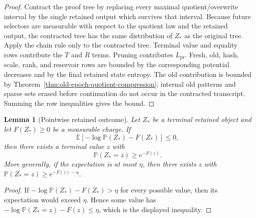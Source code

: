 \documentclass[11pt]{article}
\newtheorem{lemma}[theorem]{Lemma}
\theoremstyle{remark}
\newcommand{\E}{\mathbb E}
\newcommand{\Prob}{\mathbb P}
\newcommand{\pr}{\mathrm{pr}}
\begin{document}
\begin{proof}
Contract the proof tree by replacing every maximal quotient/overwrite interval by the single retained output which survives that interval.  Because future selectors are measurable with respect to the quotient law and the retained output, the contracted tree has the same distribution of $Z_*$ as the original tree.  Apply the chain rule only to the contracted tree.  Terminal value and equality rows contribute the $T$ and $R$ terms.  Pruning contributes $L_{\pr}$.  Fresh, old, hash, scale, rank, and reservoir rows are bounded by the corresponding potential decreases and by the final retained state entropy.  The old contribution is bounded by Theorem~\ref{thm:old-epoch-quotient-compression}; internal old patterns and sparse sets erased before continuation do not occur in the contracted transcript.  Summing the row inequalities gives the bound.
\end{proof}

\begin{lemma}[Pointwise retained outcome]\label{lem:pointwise-retained-outcome}
Let $Z_*$ be a terminal retained object and let $F(Z_*)\ge 0$ be a measurable charge.  If
\[
        \E[-\log \Prob(Z_*)-F(Z_*)]\le 0,
\]
then there exists a terminal value $z$ with
\[
        \Prob(Z_*=z)\ge e^{-F(z)}.
\]
More generally, if the expectation is at most $\eta$, then there exists $z$ with $\Prob(Z_*=z)\ge e^{-F(z)-\eta}$.
\end{lemma}

\begin{proof}
If $-\log\Prob(Z_*)-F(Z_*)>\eta$ for every possible value, then its expectation would exceed $\eta$.  Hence some value has $-\log\Prob(Z_*=z)-F(z)\le\eta$, which is the displayed inequality.
\end{proof}
\end{document}
